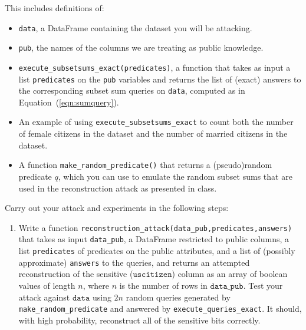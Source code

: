 \documentclass[11pt]{article}
\newcommand{\data}{\texttt{data}}
\newcommand{\us}{\texttt{uscitizen}}
\begin{document}
\begin{enumerate}[leftmargin=*]
		This includes definitions of:
		\begin{itemize}
			\item \texttt{data}, a DataFrame containing the dataset you will be attacking.
			\item \texttt{pub}, the names of the columns we are treating as public knowledge.

			\item \texttt{execute\_subsetsums\_exact(predicates)}, a function that takes as input a list \texttt{predicates} on the \texttt{pub} variables and returns the list of (exact) answers to the corresponding subset sum queries on \texttt{data}, computed as in Equation~(\ref{eqn:sumquery}). 
			\item An example of using \texttt{execute\_subsetsums\_exact} to count both the number of female citizens in the dataset and the number of married citizens in the dataset.
			\item A function \texttt{make\_random\_predicate()} that returns a (pseudo)random predicate $q$, which you can use to emulate the random subset sums that are used in the reconstruction attack as presented in class.

		\end{itemize}
		
		Carry out your attack and experiments in the following steps:
		\begin{enumerate}

			
			\item Write a function \texttt{reconstruction\_attack(data\_pub,predicates,answers)} that takes as input \texttt{data\_pub}, a DataFrame restricted to public columns, a list \texttt{predicates} of predicates on the public attributes, and a list of  (possibly approximate) \texttt{answers} to the queries, and returns an attempted reconstruction of the sensitive ($\us$) column as an array of boolean values of length $n$, where $n$ is the number of rows in $\texttt{data\_pub}$.  
			Test your attack against $\data$ using $2n$ random queries generated by \texttt{make\_random\_predicate} and answered by \texttt{execute\_queries\_exact}.  It should, with high probability, reconstruct all of the sensitive bits correctly.
			

\end{enumerate}
\end{enumerate}
\end{document}
